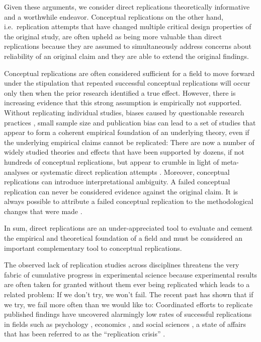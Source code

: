 \documentclass[cm,linguex]{glossa}
\begin{document}
Given these arguments, we consider direct replications theoretically informative and a worthwhile endeavor.
Conceptual replications on the other hand, i.e.~replication attempts that have changed multiple critical design properties of the original study, are often upheld as being more valuable than direct replications because they are assumed to simultaneously address concerns about reliability of an original claim and they are able to extend the original findings.

Conceptual replications are often considered sufficient for a field to move forward under the stipulation that repeated successful conceptual replications will occur only then when the prior research identified a true effect.
However, there is increasing evidence that this strong assumption is empirically not supported.
Without replicating individual studies, biases caused by questionable research practices \citep{john2012measuring}, small sample size \citep{button2013power} and publication bias \citep{fanelli2012negative} can lead to a set of studies that appear to form a coherent empirical foundation of an underlying theory, even if the underlying empirical claims cannot be replicated:
There are now a number of widely studied theories and effects that have been supported by dozens, if not hundreds of conceptual replications, but appear to crumble in light of meta-analyses or systematic direct replication attempts \citep[e.g.,][]{shanks2015romance, wagenmakers2016registered}.
Moreover, conceptual replications can introduce interpretational ambiguity.
A failed conceptual replication can never be considered evidence against the original claim.
It is always possible to attribute a failed conceptual replication to the methodological changes that were made \citep[e.g.,][]{pashler2012replicability}.

In sum, direct replications are an under-appreciated tool to evaluate and cement the empirical and theoretical foundation of a field and must be considered an important complementary tool to conceptual replications.

The observed lack of replication studies across disciplines threatens the very fabric of cumulative progress in experimental science because experimental results are often taken for granted without them ever being replicated which leads to a related problem: If we don't try, we won't fail. The recent past has shown that if we try, we fail more often than we would like to: Coordinated efforts to replicate published findings have uncovered alarmingly low rates of successful replications in fields such as psychology \citep{open_science_collaboration_estimating_2015}, economics \citep{camerer_evaluating_2016}, and social sciences \citep{camerer_evaluating_2018}, a state of affairs that has been referred to as the ``replication crisis'' \citep{fidler_reproducibility_2018}.
\end{document}

